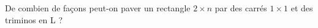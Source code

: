 De combien de façons peut-on paver un rectangle $2 \times n$ par des carrés $1 \times 1$ et des triminos en L ?
